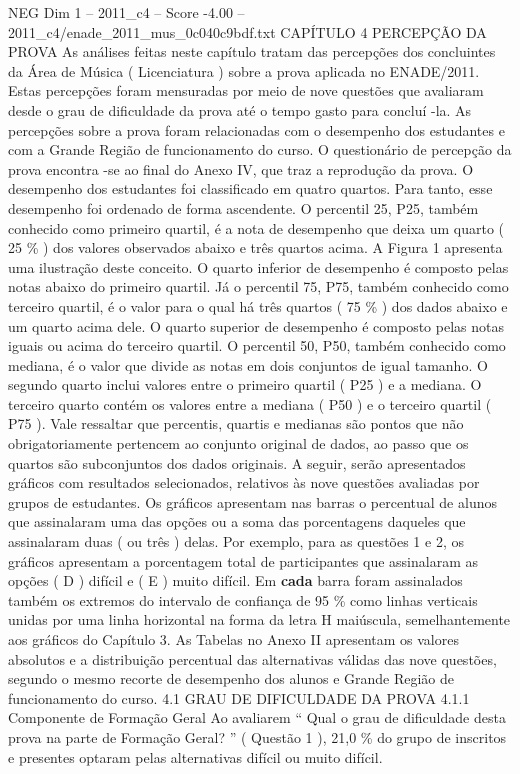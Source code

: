 \begin{textsample}{NEG Dim 1 – 2011\_c4 – Score -4.00 – 2011\_c4/enade\_2011\_mus\_0c040c9bdf.txt}  \label{ex:f1_neg_120}
CAPÍTULO 4 PERCEPÇÃO DA PROVA As análises feitas neste capítulo tratam das percepções dos concluintes da Área de Música ( Licenciatura ) sobre a prova aplicada no ENADE/2011.
Estas percepções foram mensuradas por meio de nove questões que avaliaram desde o grau de dificuldade da prova até o tempo gasto para concluí -la.
As percepções sobre a prova foram relacionadas com o desempenho dos estudantes e com a Grande Região de funcionamento do curso.
O questionário de percepção da prova encontra -se ao final do Anexo IV, que traz a reprodução da prova.
O desempenho dos estudantes foi classificado em quatro quartos.
Para tanto, esse desempenho foi ordenado de forma ascendente.
O percentil 25, P25, também conhecido como primeiro quartil, é a nota de desempenho que deixa um quarto ( 25 \% ) dos valores observados abaixo e três quartos acima.
A Figura 1 apresenta uma ilustração deste conceito.
O quarto inferior de desempenho é composto pelas notas abaixo do primeiro quartil.
Já o percentil 75, P75, também conhecido como terceiro quartil, é o valor para o qual há três quartos ( 75 \% ) dos dados abaixo e um quarto acima dele.
O quarto superior de desempenho é composto pelas notas iguais ou acima do terceiro quartil.
O percentil 50, P50, também conhecido como mediana, é o valor que divide as notas em dois conjuntos de igual tamanho.
O segundo quarto inclui valores entre o primeiro quartil ( P25 ) e a mediana.
O terceiro quarto contém os valores entre a mediana ( P50 ) e o terceiro quartil ( P75 ).
Vale ressaltar que percentis, quartis e medianas são pontos que não obrigatoriamente pertencem ao conjunto original de dados, ao passo que os quartos são subconjuntos dos dados originais.
A seguir, serão apresentados gráficos com resultados selecionados, relativos às nove questões avaliadas por grupos de estudantes.
Os gráficos apresentam nas barras o percentual de alunos que assinalaram uma das opções ou a soma das porcentagens daqueles que assinalaram duas ( ou três ) delas.
Por exemplo, para as questões 1 e 2, os gráficos apresentam a porcentagem total de participantes que assinalaram as opções ( D ) difícil e ( E ) muito difícil.
Em \textbf{cada} barra foram assinalados também os extremos do intervalo de confiança de 95 \% como linhas verticais unidas por uma linha horizontal na forma da letra H maiúscula, semelhantemente aos gráficos do Capítulo 3.
As Tabelas no Anexo II apresentam os valores absolutos e a distribuição percentual das alternativas válidas das nove questões, segundo o mesmo recorte de desempenho dos alunos e Grande Região de funcionamento do curso. 4.1 GRAU DE DIFICULDADE DA PROVA 4.1.1 Componente de Formação Geral Ao avaliarem “ Qual o grau de dificuldade desta prova na parte de Formação Geral? ” ( Questão 1 ), 21,0 \% do grupo de inscritos e presentes optaram pelas alternativas difícil ou muito difícil.

\end{textsample}
